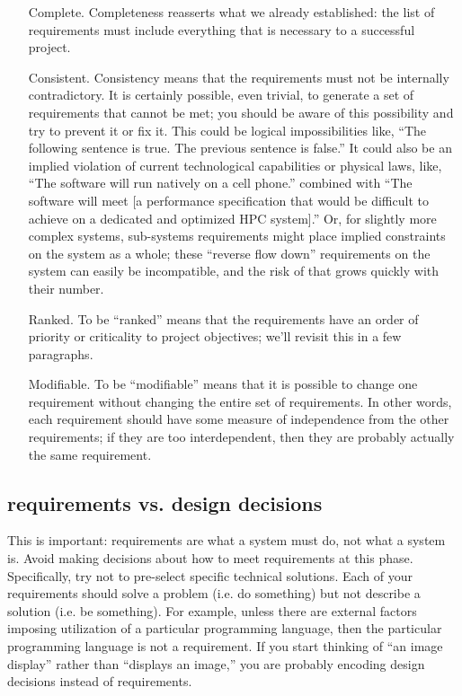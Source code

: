 \documentclass[12pt,oneside]{book}
\begin{document}
\begin{itemize}[wide, labelwidth=!, labelindent=0pt, font=\bfseries]
\item[Complete.] Completeness reasserts what we already established: the list of requirements must include everything that is necessary to a successful project.
	
\item[Consistent.] Consistency means that the requirements must not be internally contradictory. It is certainly possible, even trivial, to generate a set of requirements that cannot be met; you should be aware of this possibility and try to prevent it or fix it. This could be logical impossibilities like, ``The following sentence is true. The previous sentence is false.'' It could also be an implied violation of current technological capabilities or physical laws, like, ``The software will run natively on a cell phone.'' combined with ``The software will meet [a performance specification that would be difficult to achieve on a dedicated and optimized HPC system].'' Or, for slightly more complex systems, sub-systems requirements might place implied constraints on the system as a whole; these ``reverse flow down'' requirements on the system can easily be incompatible, and the risk of that grows quickly with their number.
	
\item[Ranked.] To be ``ranked'' means that the requirements have an order of priority or criticality to project objectives; we'll revisit this in a few paragraphs.
	
\item[Modifiable.] To be ``modifiable'' means that it is possible to change one requirement without changing the entire set of requirements. In other words, each requirement should have some measure of independence from the other requirements; if they are too interdependent, then they are probably actually the same requirement.
\end{itemize}

\subsection*{requirements vs. design decisions}
\label{scrivauto:22}

This is important: requirements are what a system must do, not what a system is. Avoid making decisions about how to meet requirements at this phase. Specifically, try not to pre-select specific technical solutions. Each of your requirements should solve a problem (i.e. do something) but not describe a solution (i.e. be something). For example, unless there are external factors imposing utilization of a particular programming language, then the particular programming language is not a requirement. If you start thinking of ``an image display'' rather than ``displays an image,'' you are probably encoding design decisions instead of requirements.
\end{document}
